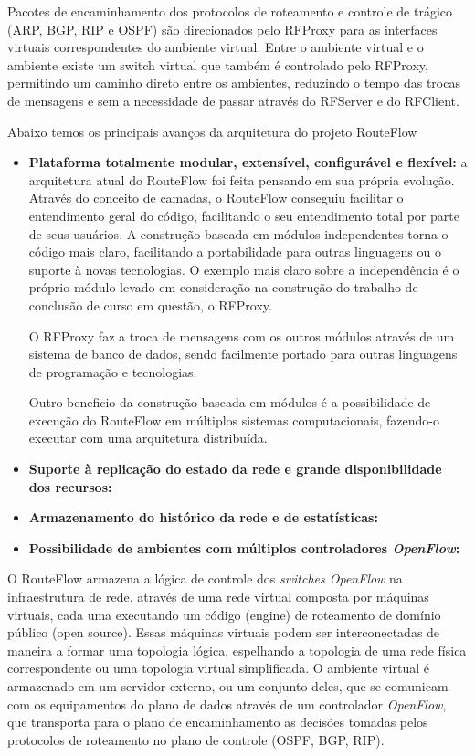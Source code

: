 Pacotes de encaminhamento dos protocolos de roteamento 
e controle de trágico (ARP, BGP, RIP e OSPF) são direcionados
pelo RFProxy para as interfaces virtuais correspondentes do
ambiente virtual. Entre o ambiente virtual e o ambiente existe
um switch virtual que também é controlado pelo RFProxy,
permitindo um caminho direto entre os ambientes, reduzindo 
o tempo das trocas de mensagens e sem a necessidade de passar
através do RFServer e do RFClient.

Abaixo temos os principais avanços da arquitetura do projeto
RouteFlow

\begin{itemize}
\item \textbf{Plataforma totalmente modular, extensível, 
configurável e flexível:} a arquitetura atual do RouteFlow 
foi feita pensando em sua própria evolução. Através do 
conceito de camadas, o RouteFlow conseguiu facilitar o entendimento
geral do código, facilitando o seu entendimento total por parte de 
seus usuários. A construção baseada em módulos independentes
torna o código mais claro, facilitando a portabilidade para outras 
linguagens ou o suporte à novas tecnologias. O exemplo mais 
claro sobre a independência é o próprio módulo levado em consideração
na construção do trabalho de conclusão de curso em questão, o
RFProxy. 

O RFProxy faz a troca de mensagens com os outros módulos 
através de um sistema de banco de dados, sendo facilmente
portado para outras linguagens de programação e tecnologias.

Outro beneficio da construção baseada em módulos é a possibilidade
de execução do RouteFlow em múltiplos sistemas computacionais, 
fazendo-o executar com uma arquitetura distribuída. 
\item \textbf{Suporte à replicação do estado da rede e grande
disponibilidade dos recursos:}
\item \textbf{Armazenamento do histórico da rede e de estatísticas:}
\item \textbf{Possibilidade de ambientes com múltiplos controladores
\textit{OpenFlow}:}
\end{itemize}

O RouteFlow armazena a lógica de
controle dos \textit{switches OpenFlow} na infraestrutura de rede,
através de uma rede virtual composta por máquinas virtuais, cada uma executando um código
(engine) de roteamento de domínio público (open source).
Essas máquinas virtuais podem ser interconectadas
de maneira a formar uma topologia lógica, espelhando a
topologia de uma rede física correspondente ou uma topologia
virtual simplificada. O ambiente virtual é armazenado em um
servidor externo, ou um conjunto deles, que se comunicam com
os equipamentos do plano de dados através de um controlador
\textit{OpenFlow}, que transporta para o plano de encaminhamento as
decisões tomadas pelos protocolos de roteamento no plano de
controle (OSPF, BGP, RIP). 

